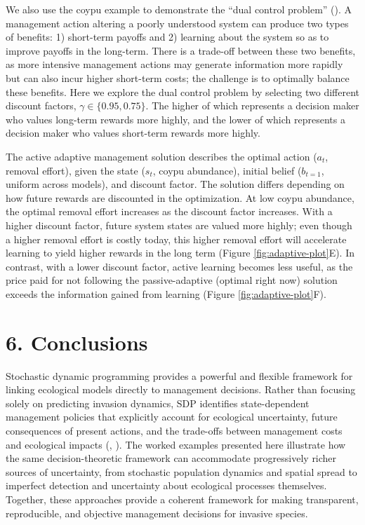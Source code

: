 \documentclass[
  11pt,
  a4paper,
]{article}
\begin{document}
We also use the coypu example to demonstrate the ``dual control problem'' (). A management action altering a poorly understood system can produce two types of benefits: 1) short-term payoffs and 2) learning about the system so as to improve payoffs in the long-term. There is a trade-off between these two benefits, as more intensive management actions may generate information more rapidly but can also incur higher short-term costs; the challenge is to optimally balance these benefits. Here we explore the dual control problem by selecting two different discount factors, \(\gamma \in \{0.95, 0.75 \}\). The higher of which represents a decision maker who values long-term rewards more highly, and the lower of which represents a decision maker who values short-term rewards more highly.

The active adaptive management solution describes the optimal action (\(a_t\), removal effort), given the state (\(s_t\), coypu abundance), initial belief (\(b_{t=1}\), uniform across models), and discount factor. The solution differs depending on how future rewards are discounted in the optimization. At low coypu abundance, the optimal removal effort increases as the discount factor increases. With a higher discount factor, future system states are valued more highly; even though a higher removal effort is costly today, this higher removal effort will accelerate learning to yield higher rewards in the long term (Figure \ref{fig:adaptive-plot}E). In contrast, with a lower discount factor, active learning becomes less useful, as the price paid for not following the passive-adaptive (optimal right now) solution exceeds the information gained from learning (Figure \ref{fig:adaptive-plot}F).

\section{6. Conclusions}\label{conclusions}

Stochastic dynamic programming provides a powerful and flexible framework for linking ecological models directly to management decisions. Rather than focusing solely on predicting invasion dynamics, SDP identifies state-dependent management policies that explicitly account for ecological uncertainty, future consequences of present actions, and the trade-offs between management costs and ecological impacts (, ). The worked examples presented here illustrate how the same decision-theoretic framework can accommodate progressively richer sources of uncertainty, from stochastic population dynamics and spatial spread to imperfect detection and uncertainty about ecological processes themselves. Together, these approaches provide a coherent framework for making transparent, reproducible, and objective management decisions for invasive species.
\end{document}
